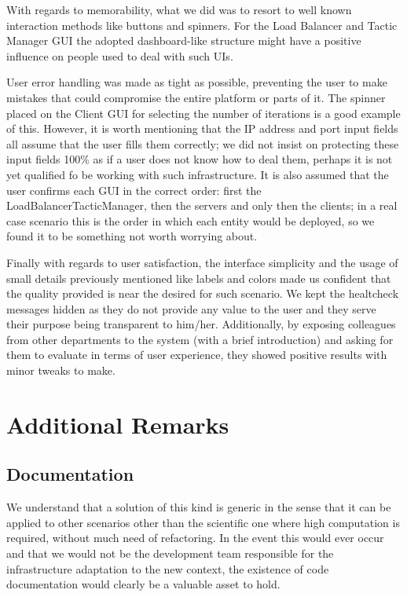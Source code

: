 \documentclass[12pt]{article}
\begin{document}
With regards to memorability, what we did was to resort to well known interaction methods like buttons and spinners.
For the Load Balancer and Tactic Manager GUI the adopted dashboard-like structure might have a positive influence on people used to deal with such UIs.

User error handling was made as tight as possible, preventing the user to make mistakes that could compromise the entire platform or parts of it.
The spinner placed on the Client GUI for selecting the number of iterations is a good example of this.
However, it is worth mentioning that the IP address and port input fields all assume that the user fills them correctly; we did not insist on protecting these 
input fields 100\% as if a user does not know how to deal them, perhaps it is not yet qualified fo be working with such infrastructure.
It is also assumed that the user confirms each GUI in the correct order: first the LoadBalancerTacticManager, then the servers and only then the clients; in 
a real case scenario this is the order in which each entity would be deployed, so we found it to be something not worth worrying about.

Finally with regards to user satisfaction, the interface simplicity and the usage of small details previously mentioned like labels and colors made us confident
that the quality provided is near the desired for such scenario.
We kept the healtcheck messages hidden as they do not provide any value to the user and they serve their purpose being transparent to him/her.
Additionally, by exposing colleagues from other departments to the system (with a brief introduction) and asking for them to evaluate in terms of user experience,
they showed positive results with minor tweaks to make.

\newpage
\section{Additional Remarks} \label{remarks} %

\subsection{Documentation} \label{documentation} %

We understand that a solution of this kind is generic in the sense that it can be applied to other scenarios other than the scientific one where high computation
is required, without much need of refactoring.
In the event this would ever occur and that we would not be the development team responsible for the infrastructure adaptation to the new context,
the existence of code documentation would clearly be a valuable asset to hold.
\end{document}
